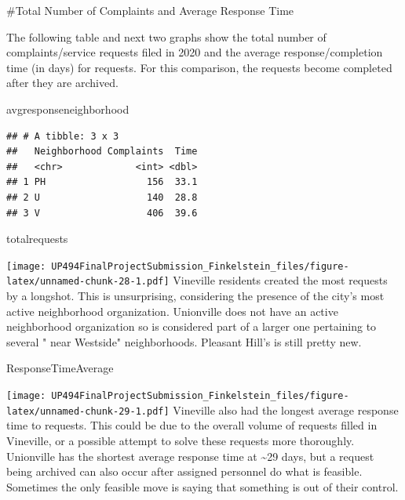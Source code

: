 \documentclass[
]{article}
\newenvironment{Shaded}{\begin{snugshade}}{\end{snugshade}}
\newcommand{\NormalTok}[1]{#1}
\begin{document}
\#Total Number of Complaints and Average Response Time

The following table and next two graphs show the total number of
complaints/service requests filed in 2020 and the average
response/completion time (in days) for requests. For this comparison,
the requests become completed after they are archived.

\begin{Shaded}
\begin{Highlighting}[]
\NormalTok{avgresponseneighborhood}
\end{Highlighting}
\end{Shaded}

\begin{verbatim}
## # A tibble: 3 x 3
##   Neighborhood Complaints  Time
##   <chr>             <int> <dbl>
## 1 PH                  156  33.1
## 2 U                   140  28.8
## 3 V                   406  39.6
\end{verbatim}

\begin{Shaded}
\begin{Highlighting}[]
\NormalTok{totalrequests}
\end{Highlighting}
\end{Shaded}

\texttt{[image: UP494FinalProjectSubmission\_Finkelstein\_files/figure-latex/unnamed-chunk-28-1.pdf]}
Vineville residents created the most requests by a longshot. This is
unsurprising, considering the presence of the city's most active
neighborhood organization. Unionville does not have an active
neighborhood organization so is considered part of a larger one
pertaining to several " near Westside" neighborhoods. Pleasant Hill's is
still pretty new.

\begin{Shaded}
\begin{Highlighting}[]
\NormalTok{ResponseTimeAverage}
\end{Highlighting}
\end{Shaded}

\texttt{[image: UP494FinalProjectSubmission\_Finkelstein\_files/figure-latex/unnamed-chunk-29-1.pdf]}
Vineville also had the longest average response time to requests. This
could be due to the overall volume of requests filled in Vineville, or a
possible attempt to solve these requests more thoroughly. Unionville has
the shortest average response time at \textasciitilde29 days, but a
request being archived can also occur after assigned personnel do what
is feasible. Sometimes the only feasible move is saying that something
is out of their control.
\end{document}
